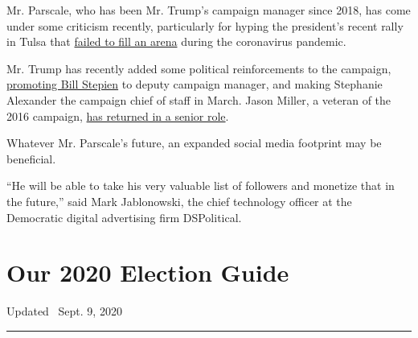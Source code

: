 Mr. Parscale, who has been Mr. Trump's campaign manager since 2018, has
come under some criticism recently, particularly for hyping the
president's recent rally in Tulsa that
\href{https://www.nytimes3xbfgragh.onion/2020/06/20/us/politics/tulsa-trump-rally.html}{failed
to fill an arena} during the coronavirus pandemic.

Mr. Trump has recently added some political reinforcements to the
campaign,
\href{https://www.nytimes3xbfgragh.onion/2020/05/26/us/politics/trump-campaign-bill-stepien.html}{promoting
Bill Stepien} to deputy campaign manager, and making Stephanie Alexander
the campaign chief of staff in March. Jason Miller, a veteran of the
2016 campaign,
\href{https://www.politico.com/news/2020/06/05/trump-campaign-hires-jason-miller-303582}{has
returned in a senior role}.

Whatever Mr. Parscale's future, an expanded social media footprint may
be beneficial.

``He will be able to take his very valuable list of followers and
monetize that in the future,'' said Mark Jablonowski, the chief
technology officer at the Democratic digital advertising firm
DSPolitical.

\hypertarget{our-2020-election-guide}{%
\section{Our 2020 Election Guide}\label{our-2020-election-guide}}

Updated ~Sept. 9, 2020

\begin{center}\rule{0.5\linewidth}{\linethickness}\end{center}

